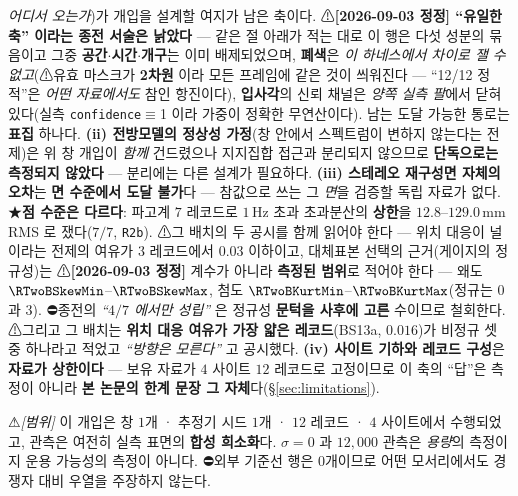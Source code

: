 \documentclass[11pt]{report}
\numberwithin{equation}{chapter}
\numberwithin{figure}{chapter}
\numberwithin{table}{chapter}
\begin{document}
\emph{어디서 오는가})가 개입을 설계할 여지가 남은 축이다. ⚠\textbf{[2026-09-03 정정]
``유일한 축'' 이라는 종전 서술은 낡았다} --- 같은 절 아래가 적는 대로 이 행은
다섯 성분의 묶음이고 그중 \textbf{공간$\cdot$시간$\cdot$개구}는 이미 배제되었으며,
\textbf{폐색}은 \emph{이 하네스에서 차이로 잴 수 없고}(⚠유효 마스크가 \textbf{2차원}
이라 모든 프레임에 같은 것이 씌워진다 --- ``12/12 정적''은 \emph{어떤 자료에서도} 참인
항진이다), \textbf{입사각}의 신뢰 채널은 \emph{양쪽 실측 팔}에서 닫혀 있다(실측
\texttt{confidence}$\equiv$1 이라 가중이 정확한 무연산이다). 남는 도달 가능한 통로는 \textbf{표집} 하나다.
\textbf{(ii) 전방모델의 정상성 가정}(창 안에서 스펙트럼이 변하지 않는다는 전제)은 위 창
개입이 \emph{함께} 건드렸으나 지지집합 접근과 분리되지 않으므로 \textbf{단독으로는
측정되지 않았다} --- 분리에는 다른 설계가 필요하다. \textbf{(iii) 스테레오 재구성면 자체의
오차}는 \textbf{면 수준에서 도달 불가}다 --- 참값으로 쓰는 그 \emph{면}을 검증할 독립
자료가 없다. ★\textbf{점 수준은 다르다}: 파고계 $7$ 레코드로 $1$\,Hz 초과 초과분산의
\textbf{상한}을 $12.8$–$129.0$\,mm RMS 로 쟀다($7/7$, \texttt{R2b}).
⚠그 배치의 두 공시를 함께 읽어야 한다 --- 위치 대응이 널이라는 전제의 여유가 $3$ 레코드에서
$0.03$ 이하이고, 대체표본 선택의 근거(게이지의 정규성)는 ⚠\textbf{[2026-09-03 정정]}
계수가 아니라 \textbf{측정된 범위}로 적어야 한다 --- 왜도 $\RTwoBSkewMin$–$\RTwoBSkewMax$,
첨도 $\RTwoBKurtMin$–$\RTwoBKurtMax$(정규는 $0$ 과 $3$). ⛔종전의 \emph{``$4/7$ 에서만
성립''} 은 정규성 \textbf{문턱을 사후에 고른} 수이므로 철회한다.
⚠그리고 그 배치는 \textbf{위치 대응 여유가 가장 얇은 레코드}(BS13a, $0.016$)가
비정규 셋 중 하나라고 적었고 \emph{``방향은 모른다''} 고 공시했다.
\textbf{(iv) 사이트 기하와 레코드 구성}은 \textbf{자료가 상한이다} --- 보유 자료가
$4$ 사이트 $12$ 레코드로 고정이므로 이 축의 ``답''은 측정이 아니라 \textbf{본 논문의
한계 문장 그 자체}다(\S\ref{sec:limitations}).

⚠\emph{[범위]} 이 개입은 창 $1$개 · 추정기 시드 $1$개 · $12$ 레코드 · $4$
사이트에서 수행되었고, 관측은 여전히 실측 표면의 \textbf{합성 희소화}다. $\sigma = 0$ 과
$12{,}000$ 관측은 \emph{용량}의 측정이지 운용 가능성의 측정이 아니다. ⛔외부 기준선 행은
$0$개이므로 어떤 모서리에서도 경쟁자 대비 우열을 주장하지 않는다.
\end{document}
